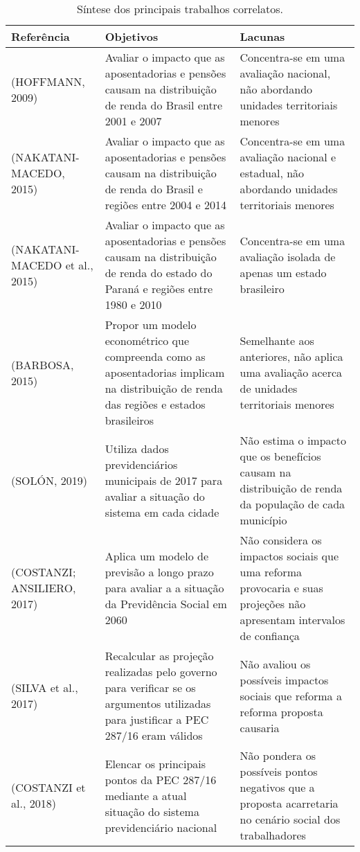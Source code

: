 \begin{longtable}{|p{}|p{}|p{}|}
\caption{Síntese dos principais trabalhos correlatos.}
\\\hline 
\textbf{Referência} & \textbf{Objetivos} & \textbf{Lacunas} \\ \hline
\footnotesize{(HOFFMANN, 2009)} & Avaliar o impacto que as aposentadorias e pensões causam na distribuição de renda do Brasil entre 2001 e 2007 & Concentra-se em uma avaliação nacional, não abordando unidades territoriais menores \\ \hline
\footnotesize{(NAKATANI-MACEDO, 2015)} & Avaliar o impacto que as aposentadorias e pensões causam na distribuição de renda do Brasil e regiões entre 2004 e 2014 & Concentra-se em uma avaliação nacional e estadual, não abordando unidades territoriais menores \\ \hline
\footnotesize{(NAKATANI-MACEDO et al., 2015)} & Avaliar o impacto que as aposentadorias e pensões causam na distribuição de renda do estado do Paraná e regiões entre 1980 e 2010 & Concentra-se em uma avaliação isolada de apenas um estado brasileiro \\ \hline
\footnotesize{(BARBOSA, 2015)} & Propor um modelo econométrico que compreenda como as aposentadorias implicam na distribuição de renda das regiões e estados brasileiros & Semelhante aos anteriores, não aplica uma avaliação acerca de unidades territoriais menores \\ \hline
\footnotesize{(SOLÓN, 2019)} & Utiliza dados previdenciários municipais de 2017 para avaliar a situação do sistema em cada cidade & Não estima o impacto que os benefícios causam na distribuição de renda da população de cada município \\ \hline
\footnotesize{(COSTANZI; ANSILIERO, 2017)} & Aplica um modelo de previsão a longo prazo para avaliar a a situação da Previdência Social em 2060 & Não considera os impactos sociais que uma reforma provocaria e suas projeções não apresentam intervalos de confiança \\ \hline
\footnotesize{(SILVA et al., 2017)} & Recalcular as projeção realizadas pelo governo para verificar se os argumentos utilizadas para justificar  a PEC 287/16 eram válidos & Não avaliou os possíveis impactos sociais que reforma a reforma proposta causaria \\ \hline
\footnotesize{(COSTANZI et al., 2018)} & Elencar os principais pontos da PEC 287/16 mediante a atual situação do sistema previdenciário nacional & Não pondera os possíveis pontos negativos que a proposta acarretaria no cenário social dos trabalhadores \\ \hline

\end{longtable}
